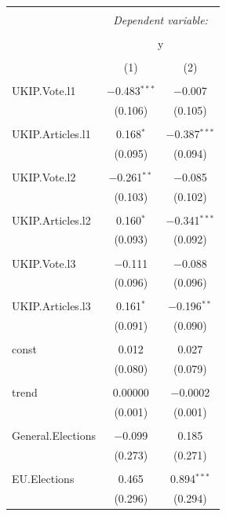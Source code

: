 \documentclass[12pt,article]{article}
\begin{document}
\begin{table}[!htbp] \centering 
  \caption{} 
  \label{} 
\begin{tabular}{@{\extracolsep{5pt}}lcc} 
\\[-1.8ex]\hline 
\hline \\[-1.8ex] 
 & \multicolumn{2}{c}{\textit{Dependent variable:}} \\ 
\cline{2-3} 
\\[-1.8ex] & \multicolumn{2}{c}{y} \\ 
\\[-1.8ex] & (1) & (2)\\ 
\hline \\[-1.8ex] 
 UKIP.Vote.l1 & $-$0.483$^{***}$ & $-$0.007 \\ 
  & (0.106) & (0.105) \\ 
  & & \\ 
 UKIP.Articles.l1 & 0.168$^{*}$ & $-$0.387$^{***}$ \\ 
  & (0.095) & (0.094) \\ 
  & & \\ 
 UKIP.Vote.l2 & $-$0.261$^{**}$ & $-$0.085 \\ 
  & (0.103) & (0.102) \\ 
  & & \\ 
 UKIP.Articles.l2 & 0.160$^{*}$ & $-$0.341$^{***}$ \\ 
  & (0.093) & (0.092) \\ 
  & & \\ 
 UKIP.Vote.l3 & $-$0.111 & $-$0.088 \\ 
  & (0.096) & (0.096) \\ 
  & & \\ 
 UKIP.Articles.l3 & 0.161$^{*}$ & $-$0.196$^{**}$ \\ 
  & (0.091) & (0.090) \\ 
  & & \\ 
 const & 0.012 & 0.027 \\ 
  & (0.080) & (0.079) \\ 
  & & \\ 
 trend & 0.00000 & $-$0.0002 \\ 
  & (0.001) & (0.001) \\ 
  & & \\ 
 General.Elections & $-$0.099 & 0.185 \\ 
  & (0.273) & (0.271) \\ 
  & & \\ 
 EU.Elections & 0.465 & 0.894$^{***}$ \\ 
  & (0.296) & (0.294) \\ 

\end{tabular}
\end{table}
\end{document}
